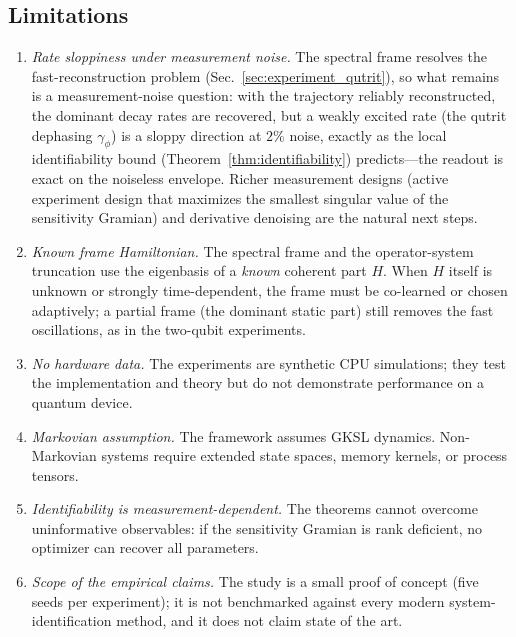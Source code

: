 \documentclass[twocolumn,aps,prxquantum,superscriptaddress,nofootinbib,floatfix,longbibliography]{revtex4-2}
\begin{document}
\subsection{Limitations}
\label{sec:limitations}

\begin{enumerate}[leftmargin=1.5em]
    \item \emph{Rate sloppiness under measurement noise.} The spectral frame resolves the fast-reconstruction problem (Sec.~\ref{sec:experiment_qutrit}), so what remains is a measurement-noise question: with the trajectory reliably reconstructed, the dominant decay rates are recovered, but a weakly excited rate (the qutrit dephasing $\gamma_\phi$) is a sloppy direction at $2\%$ noise, exactly as the local identifiability bound (Theorem~\ref{thm:identifiability}) predicts---the readout is exact on the noiseless envelope. Richer measurement designs (active experiment design that maximizes the smallest singular value of the sensitivity Gramian) and derivative denoising are the natural next steps.
    \item \emph{Known frame Hamiltonian.} The spectral frame and the operator-system truncation use the eigenbasis of a \emph{known} coherent part $H$. When $H$ itself is unknown or strongly time-dependent, the frame must be co-learned or chosen adaptively; a partial frame (the dominant static part) still removes the fast oscillations, as in the two-qubit experiments.
    \item \emph{No hardware data.} The experiments are synthetic CPU simulations; they test the implementation and theory but do not demonstrate performance on a quantum device.
    \item \emph{Markovian assumption.} The framework assumes GKSL dynamics. Non-Markovian systems require extended state spaces, memory kernels, or process tensors.
    \item \emph{Identifiability is measurement-dependent.} The theorems cannot overcome uninformative observables: if the sensitivity Gramian is rank deficient, no optimizer can recover all parameters.
    \item \emph{Scope of the empirical claims.} The study is a small proof of concept (five seeds per experiment); it is not benchmarked against every modern system-identification method, and it does not claim state of the art.
\end{enumerate}
\end{document}
